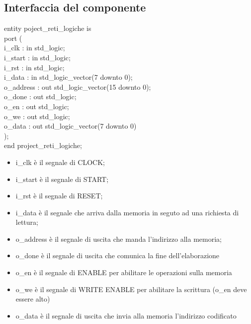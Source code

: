 \documentclass{article}
\newcommand\tab[1][1cm]{\hspace*{#1}}
\begin{document}
\subsection{Interfaccia del componente}
{\selectfont
entity poject\_reti\_logiche is\\
\tab port (\\
\tab\tab i\_clk\hspace*{1,5cm} : in std\_logic;\\
\tab\tab i\_start\hspace*{1,1cm} : in std\_logic;\\
\tab\tab i\_rst\hspace*{1,5cm} : in std\_logic;\\
\tab\tab i\_data\hspace*{1,3cm} : in std\_logic\_vector(7 downto 0);\\
\tab\tab o\_address\hspace*{0,7cm} : out std\_logic\_vector(15 downto 0);\\
\tab\tab o\_done\hspace*{1,3cm} : out std\_logic;\\
\tab\tab o\_en\hspace*{1,7cm} : out std\_logic;\\
\tab\tab o\_we\hspace*{1,7cm} : out std\_logic;\\
\tab\tab o\_data\hspace*{1,3cm} : out std\_logic\_vector(7 downto 0)\\
\tab );\\
end project\_reti\_logiche;
}
\begin{itemize}
\vspace{5mm} %
\item i\_clk è il segnale di CLOCK;
\item i\_start è il segnale di START;
\item i\_rst è il segnale di RESET;
\item i\_data è il segnale che arriva dalla memoria in seguto ad una richiesta di lettura;
\item o\_address è il segnale di uscita che manda l'indirizzo alla memoria;
\item o\_done è il segnale di uscita che comunica la fine dell'elaborazione
\item o\_en è il segnale di ENABLE per abilitare le operazioni sulla memoria
\item o\_we è il segnale di WRITE ENABLE per abilitare la scrittura ({\selectfont o\_en} deve essere alto)
\item o\_data è il segnale di uscita che invia alla memoria l'indirizzo codificato
\end{itemize}
\pagebreak
\end{document}
